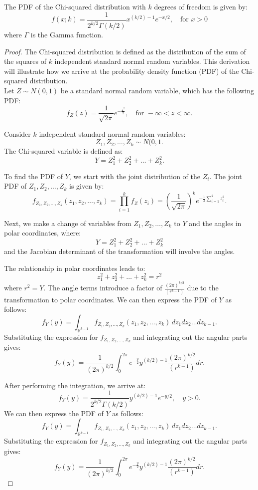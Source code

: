 \begin{definition}
    The PDF of the Chi-squared distribution with $k$ degrees of freedom is given by:
\[
f(x; k) = \frac{1}{2^{k/2} \Gamma(k/2)} x^{(k/2)-1} e^{-x/2}, \quad \text{for } x > 0
\]
where $\Gamma$ is the Gamma function.
\end{definition}

\begin{proof}
    The Chi-squared distribution is defined as the distribution of the sum of the squares of $k$ independent standard normal random variables. This derivation will illustrate how we arrive at the probability density function (PDF) of the Chi-squared distribution.\\

    Let $Z \sim N(0, 1)$ be a standard normal random variable, which has the following PDF:
\[
f_Z(z) = \frac{1}{\sqrt{2\pi}} e^{-\frac{z^2}{2}}, \quad \text{for } -\infty < z < \infty.
\]

Consider $k$ independent standard normal random variables:
\[
Z_1, Z_2, \ldots, Z_k \sim N(0, 1.
\]
The Chi-squared variable is defined as:
\[
Y = Z_1^2 + Z_2^2 + \ldots + Z_k^2.
\]

To find the PDF of $Y$, we start with the joint distribution of the $Z_i$. The joint PDF of $Z_1, Z_2, \ldots, Z_k$ is given by:
\[
f_{Z_1, Z_2, \ldots, Z_k}(z_1, z_2, \ldots, z_k) = \prod_{i=1}^{k} f_Z(z_i) = \left(\frac{1}{\sqrt{2\pi}}\right)^k e^{-\frac{1}{2} \sum_{i=1}^{k} z_i^2}.
\]

Next, we make a change of variables from $Z_1, Z_2, \ldots, Z_k$ to $Y$ and the angles in polar coordinates, where:
\[
Y = Z_1^2 + Z_2^2 + \ldots + Z_k^2
\]
and the Jacobian determinant of the transformation will involve the angles.

The relationship in polar coordinates leads to:
\[
z_1^2 + z_2^2 + \ldots + z_k^2 = r^2
\]
where $r^2 = Y$. The angle terms introduce a factor of $\frac{(2\pi)^{k/2}}{(r^{k-1})}$ due to the transformation to polar coordinates.
We can then express the PDF of $Y$ as follows:
\[
f_Y(y) = \int_{\mathbb{R}^{k-1}} f_{Z_1, Z_2, \ldots, Z_k}(z_1, z_2, \ldots, z_k) \, dz_1 dz_2 \ldots dz_{k-1}.
\]
Substituting the expression for $f_{Z_1, Z_2, \ldots, Z_k}$ and integrating out the angular parts gives:
\[
f_Y(y) = \frac{1}{(2\pi)^{k/2}} \int_{0}^{2\pi} e^{-\frac{y}{2}} y^{(k/2)-1} \frac{(2\pi)^{k/2}}{(r^{k-1})} dr.
\]

After performing the integration, we arrive at:
\[
f_Y(y) = \frac{1}{2^{k/2} \Gamma(k/2)} y^{(k/2)-1} e^{-y/2}, \quad y > 0.
\]We can then express the PDF of $Y$ as follows:
\[
f_Y(y) = \int_{\mathbb{R}^{k-1}} f_{Z_1, Z_2, \ldots, Z_k}(z_1, z_2, \ldots, z_k) \, dz_1 dz_2 \ldots dz_{k-1}.
\]
Substituting the expression for $f_{Z_1, Z_2, \ldots, Z_k}$ and integrating out the angular parts gives:
\[
f_Y(y) = \frac{1}{(2\pi)^{k/2}} \int_{0}^{2\pi} e^{-\frac{y}{2}} y^{(k/2)-1} \frac{(2\pi)^{k/2}}{(r^{k-1})} dr.
\]


\end{proof}
